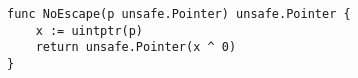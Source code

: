 \begin{lstlisting}[language=Golang, label=lst:unsafe-ex-escape-analysis, caption=Hiding a value from escape analysis, float, belowskip=-1.5em]
func NoEscape(p unsafe.Pointer) unsafe.Pointer {
	x := uintptr(p)
	return unsafe.Pointer(x ^ 0)
}
\end{lstlisting}






